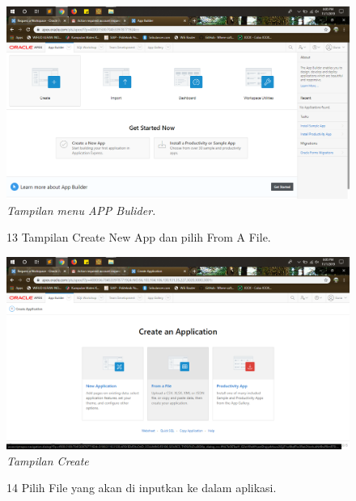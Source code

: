 \begin{enumerate}
\begin{figure}
    \begin{center}
\includegraphics[scale=0.2]{figures/g10.png}
    \caption{\textit{Tampilan menu APP Bulider.}}
        \end{center}
\label{gambar}
\end{figure}

\begin{figure}
\item[13] Tampilan Create New App dan pilih From A File.

    \begin{center}
\includegraphics[scale=0.2]{figures/g11.png}
    \caption{\textit{Tampilan Create}}
        \end{center}
\label{gambar}
\end{figure}

\begin{figure}
\item[14] Pilih File yang akan di inputkan ke dalam aplikasi.


\end{figure}
\end{enumerate}
